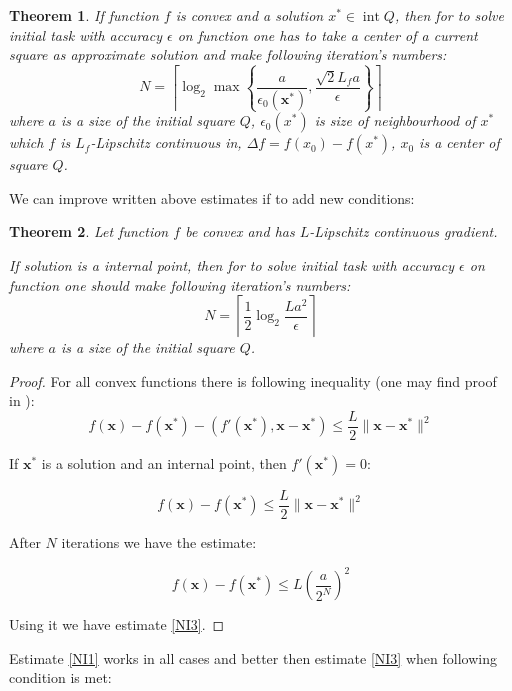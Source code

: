 \documentclass[12pt]{article}
\newtheorem{theorem}{Theorem}[section]
\DeclareMathOperator{\intt}{int}
\begin{document}
\begin{theorem}
If function $f$ is convex and a solution $x^*\in \intt Q$, then for to solve initial task with accuracy $\epsilon$ on function one has to take a center of a current square as approximate  solution and make following iteration's numbers:
\begin{equation}\label{NI2}
N = \left\lceil\log_2\max\left\{\frac{a}{\epsilon_0(\textbf{x}^*)},\frac{\sqrt{2}L_fa}{\epsilon}\right\}\right\rceil
\end{equation}
where $a$ is a size of the initial square $Q$, $\epsilon_0(x^*)$ is size of neighbourhood of $x^*$ which $f$ is $L_f$-Lipschitz continuous in, $\Delta f =  f(x_0) - f(x^*)$, $x_0$ is a center of square $Q$.
\end{theorem}

We can improve written above estimates if to add new conditions:

\begin{theorem}
Let function $f$ be convex and has $L$-Lipschitz continuous gradient.

If solution is a internal point, then for to solve initial task with accuracy $\epsilon$ on function one should make following iteration's numbers:
\begin{equation}\label{NI3}N = \left\lceil\frac{1}{2}\log_2\frac{La^2}{\epsilon}\right\rceil\end{equation}
where $a$ is a size of the initial square $Q$.
\end{theorem}

\begin{proof}
For all convex functions there is following inequality (one may find proof in \cite{Nesterov}):
$$f(\textbf{x}) - f(\textbf{x}^*) - (f'(\textbf{x}^*), \textbf{x} - \textbf{x}^*) \leq \frac{L}{2}\|\textbf{x}-\textbf{x}^*\|^2$$

If $\textbf{x}^*$ is a solution and an internal point, then $f'(\textbf{x}^*) = 0$:

$$f(\textbf{x}) - f(\textbf{x}^*)\leq \frac{L}{2}\|\textbf{x}-\textbf{x}^*\|^2$$

After $N$ iterations we have the estimate:

$$f(\textbf{x}) - f(\textbf{x}^*)\leq L\left(\frac{a}{2^N}\right)^2$$

Using it we have estimate \eqref{NI3}.
\end{proof}

Estimate \ref{NI1} works in all cases and better then estimate \ref{NI3} when following condition is met:
\end{document}
